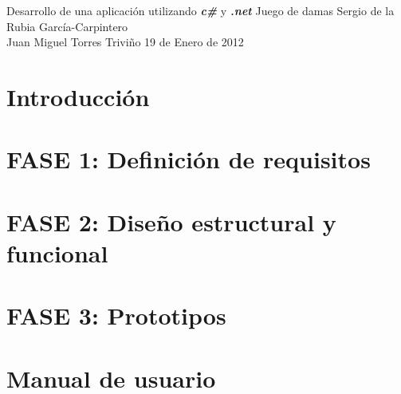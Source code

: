 \documentclass[11pt,a4paper,spanish,twoside]{report}
\begin{document}


{Desarrollo de una aplicación utilizando \emph{\textbf{c\#}} y
 \emph{\textbf{.net}}}
{Juego de damas}
{Sergio de la Rubia García-Carpintero \\Juan Miguel Torres Triviño}
{19 de Enero de 2012}


\tableofcontents


\chapter{Introducción}


\chapter{FASE 1: Definición de requisitos}


\chapter{FASE 2: Diseño estructural y funcional}


\chapter{FASE 3: Prototipos}


\chapter{Manual de usuario}

\end{document}
